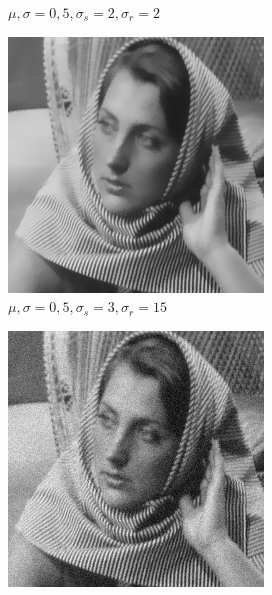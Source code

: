 \documentclass[a4paper, landscape]{article}
\begin{document}
\begin{figure}
\begin{subfigure}{0.33\linewidth}
        \caption{$\mu, \sigma = 0, 5, \sigma_s=2, \sigma_r=2$}
    \end{subfigure}
    \begin{subfigure}{0.33\linewidth}
        \centering
        \includegraphics[width=\linewidth]{barbara256,σ_noise5,σ_spatial3,σ_range15.png}
        \caption{$\mu, \sigma = 0, 5, \sigma_s=3, \sigma_r=15$}
    \end{subfigure}
    \begin{subfigure}{0.33\linewidth}
        \centering
        \includegraphics[width=\linewidth]{barbara256,σ_noise10,σ_spatial0.1,σ_range0.1.png}

\end{subfigure}
\end{figure}
\end{document}
